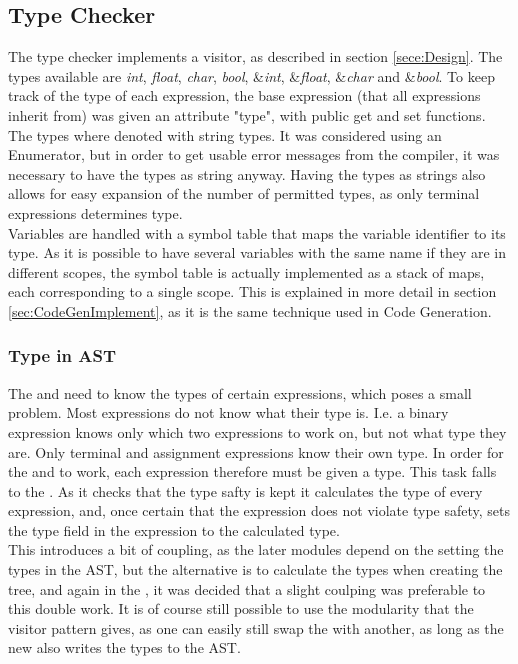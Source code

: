 \subsection{Type Checker}
\label{typecheckImpl}

The type checker implements a visitor, as described in section
\ref{sece:Design}. The types available are \textit{int}, \textit{float},
\textit{char}, \textit{bool}, \&\textit{int}, \&\textit{float}, \&\textit{char} and
\&\textit{bool}. To keep track of the type of each expression, the base expression (that all expressions inherit from) was given an attribute "type", with public get and set functions. The types where denoted with string types. It was considered using an Enumerator, but in order to get usable error messages from the \lang{} compiler, it was necessary to have the types as string anyway. Having the types as strings also allows for easy expansion of the number of permitted types, as only terminal expressions determines type.\\

Variables are handled with a symbol table that maps the variable identifier to its type. As it is possible to have several variables with the same name if they are in different scopes, the symbol table is actually implemented as a stack of maps, each corresponding to  a single scope. This is explained in more detail in section \ref{sec:CodeGenImplement}, as it is the same technique used in Code Generation.

\subsubsection{Type in AST}

The \codeGen{} and \borrowChecker{} need to know the types of certain expressions,
which poses a small problem. Most expressions do not know what their type is. I.e. a
binary expression knows only which two expressions to work on, but not what type they
are. Only terminal and assignment expressions know their own type. In order for the \borrowChecker{} and \codeGen{} to work, each expression therefore must be given a type. This task falls to the \typeChecker{}. As it checks that the type safty is kept it calculates the type of every expression, and, once certain that the expression does not violate type safety, sets the type field in the expression to the calculated type.\\

This introduces a bit of coupling, as the later modules depend on the \typeChecker{}
setting the types in the AST, but the alternative is to calculate the types when
creating the tree, and again in the \typeChecker, it was decided that a slight
coulping was preferable to this double work. It is of course still possible to use
the modularity that the visitor pattern gives, as one can easily still swap the
\typeChecker{} with another, as long as the new \typeChecker{} also writes the types to the AST.
